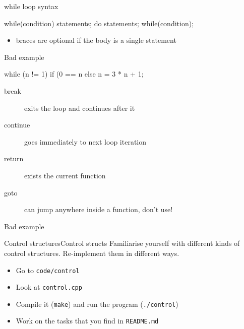 \begin{frame}[fragile]
  \begin{block}{while loop syntax}
    \begin{cppcode*}{}
      while(condition) {
        statements;
      }
      do {
        statements;
      } while(condition);
    \end{cppcode*}
    \begin{itemize}
      \item braces are optional if the body is a single statement
    \end{itemize}
  \end{block}
  \pause
  \begin{alertblock}{Bad example}
    \begin{cppcode*}{}
      while (n != 1)
        if (0 == n%
        else n = 3 * n + 1;
    \end{cppcode*}
  \end{alertblock}
\end{frame}

\begin{frame}[fragile]
  \begin{block}{}
    \begin{description}
    \item[break] exits the loop and continues after it
    \item[continue] goes immediately to next loop iteration
    \item[return] exists the current function
    \item[goto] can jump anywhere inside a function, don't use!
    \end{description}
  \end{block}
  \pause
  \begin{alertblock}{Bad example}
  \end{alertblock}
\end{frame}

\begin{frame}[fragile]
  \begin{exerciseWithShortcut}{Control structures}{Control structs}
    Familiarise yourself with different kinds of control structures. Re-implement them in different ways.
    \begin{itemize}
      \item Go to \texttt{code/control}
      \item Look at \texttt{control.cpp}
      \item Compile it (\texttt{make}) and run the program (\texttt{./control})
      \item Work on the tasks that you find in \texttt{README.md}
    \end{itemize}
  \end{exerciseWithShortcut}
\end{frame}
